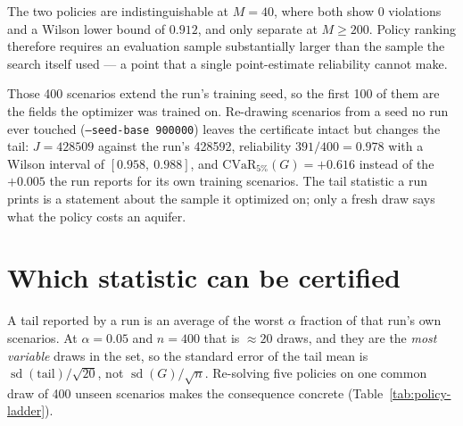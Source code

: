 The two policies are indistinguishable at $M=40$, where both show $0$ violations
and a Wilson lower bound of $0.912$, and only separate at $M\ge200$.  Policy
ranking therefore requires an evaluation sample substantially larger than the
sample the search itself used --- a point that a single point-estimate
reliability cannot make.

Those \num{400} scenarios extend the run's training seed, so the first
\num{100} of them are the fields the optimizer was trained on.  Re-drawing
scenarios from a seed no run ever touched (\texttt{--seed-base 900000}) leaves the
certificate intact but changes the tail: $J = \num{428509}$ against the run's
\num{428592}, reliability $391/400 = 0.978$ with a Wilson interval of
$[0.958,\ 0.988]$, and $\mathrm{CVaR}_{5\%}(G) = +0.616$ instead of the $+0.005$
the run reports for its own training scenarios.  The tail statistic a run prints
is a statement about the sample it optimized on; only a fresh draw says what the
policy costs an aquifer.

\section{Which statistic can be certified}

A tail reported by a run is an average of the worst $\alpha$ fraction of that
run's own scenarios.  At $\alpha=0.05$ and $n=400$ that is $\approx20$ draws, and
they are the \emph{most variable} draws in the set, so the standard error of the
tail mean is $\operatorname{sd}(\text{tail})/\sqrt{20}$, not
$\operatorname{sd}(G)/\sqrt{n}$.  Re-solving five policies on one common draw of
\num{400} unseen scenarios makes the consequence concrete
(Table~\ref{tab:policy-ladder}).

